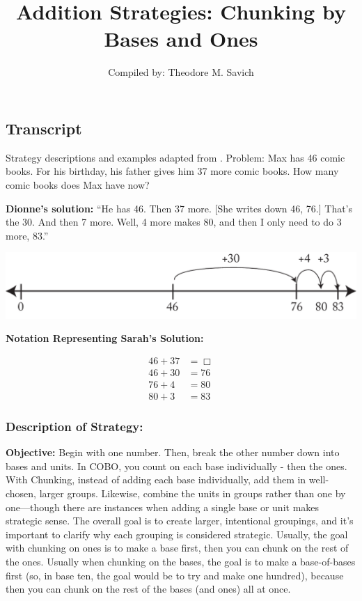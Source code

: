 \documentclass[11pt]{article}
\title{Addition Strategies: Chunking by Bases and Ones}
\author{Compiled by: Theodore M. Savich}
\begin{document}
\maketitle
\subsection*{Transcript}
Strategy descriptions and examples adapted from \textcite{HackenbergCourseNotes}. Problem: Max  has  46  comic  books. For  his  birthday,  his  father  gives him  37  more  comic  books. How  many  comic  books  does  Max  have  now? 

\textbf{Dionne's solution:} ``He has 46. Then 37 more. {[}She writes
down 46, 76.{]} That's the 30. And then 7 more. Well, 4 more makes 80,
and then I only need to do 3 more, 83.''


\includegraphics[width=.8\textwidth]{images/Easy_Pictures/SAR_ADD_CHUNKING/PDF/SAR_ADD_CHUNKING.pdf}

\noindent \textbf{Notation Representing Sarah's Solution:}

\begin{align*}
46 + 37 &= \Box \\
46 + 30 &= 76\\
76 + 4  &= 80\\
80+3 &= 83
\end{align*}

\subsubsection*{Description of Strategy:}

 \textbf{Objective:} Begin with one number. Then, break the other number down into bases and units. In COBO, you count on each base individually - then the ones. With Chunking, instead of adding each base individually, add them in well-chosen, larger groups. Likewise, combine the units in groups rather than one by one—though there are instances when adding a single base or unit makes strategic sense. The overall goal is to create larger, intentional groupings, and it’s important to clarify why each grouping is considered strategic. Usually, the goal with chunking on ones is to make a base first, then you can chunk on the rest of the ones. Usually when chunking on the bases, the goal is to make a base-of-bases first (so, in base ten, the goal would be to try and make one hundred), because then you can chunk on the rest of the bases (and ones) all at once. 
\end{document}
